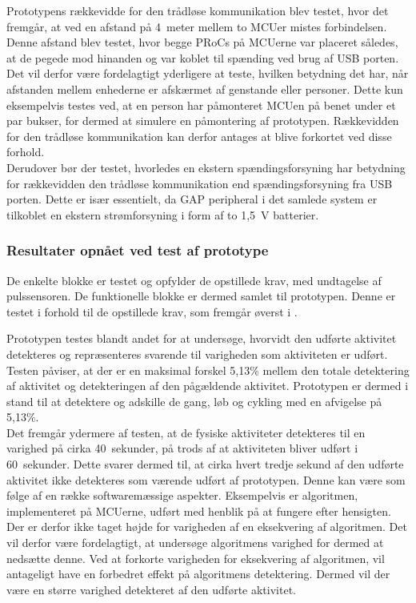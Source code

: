Prototypens rækkevidde for den trådløse kommunikation blev testet, hvor det fremgår, at ved en afstand på 4~meter mellem to MCUer mistes forbindelsen. Denne afstand blev testet, hvor begge PRoCs på MCUerne var placeret således, at de pegede mod hinanden og var koblet til spænding ved brug af USB porten. Det vil derfor være fordelagtigt yderligere at teste, hvilken betydning det har, når afstanden mellem enhederne er afskærmet af genstande eller personer. Dette kun eksempelvis testes ved, at en person har påmonteret MCUen på benet under et par bukser, for dermed at simulere en påmontering af prototypen. Rækkevidden for den trådløse kommunikation kan derfor antages at blive forkortet ved disse forhold. \\
Derudover bør der testet, hvorledes en ekstern spændingsforsyning har betydning for rækkevidden den trådløse kommunikation end spændingsforsyning fra USB porten. Dette er især essentielt, da GAP peripheral i det samlede system er tilkoblet en ekstern strømforsyning i form af to 1,5~V batterier.

\subsubsection{Resultater opnået ved test af prototype}
De enkelte blokke er testet og opfylder de opstillede krav, med undtagelse af pulssensoren. De funktionelle blokke er dermed samlet til prototypen. Denne er testet i forhold til de opstillede krav, som fremgår øverst i .

Prototypen testes blandt andet for at undersøge, hvorvidt den udførte aktivitet detekteres og repræsenteres svarende til varigheden som aktiviteten er udført. Testen påviser, at der er en maksimal forskel 5,13\% mellem den totale detektering af aktivitet og detekteringen af den pågældende aktivitet. Prototypen er dermed i stand til at detektere og adskille de gang, løb og cykling med en afvigelse på 5,13\%. \\
Det fremgår ydermere af testen, at de fysiske aktiviteter detekteres til en varighed på cirka 40~sekunder, på trods af at aktiviteten bliver udført i 60~sekunder. Dette svarer dermed til, at cirka hvert tredje sekund af den udførte aktivitet ikke detekteres som værende udført af prototypen. Denne kan være som følge af en række softwaremæssige aspekter. Eksempelvis er algoritmen, implementeret på MCUerne, udført med henblik på at fungere efter hensigten. Der er derfor ikke taget højde for varigheden af en eksekvering af algoritmen. Det vil derfor være fordelagtigt, at undersøge algoritmens varighed for dermed at nedsætte denne. Ved at forkorte varigheden for eksekvering af algoritmen, vil antageligt have en forbedret effekt på algoritmens detektering. Dermed vil der være en større varighed detekteret af den udførte aktivitet. 

